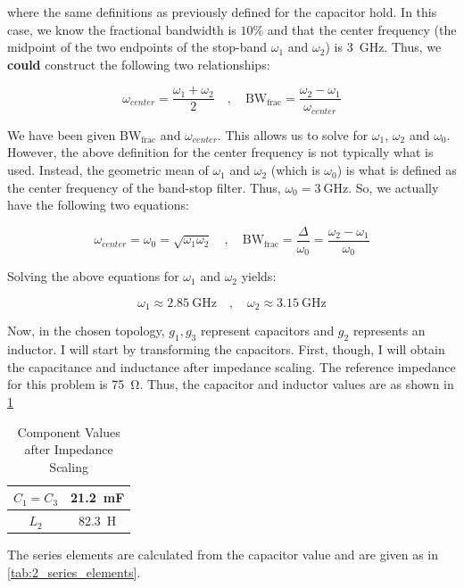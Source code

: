 where the same definitions as previously defined for the capacitor hold. In this
case, we know the fractional bandwidth is $10 \%$ and that the center frequency
(the midpoint of the two endpoints of the stop-band $\omega_1$ and $\omega_2$)
is \SI{3}{\giga\hertz}. Thus, we \textbf{could} construct the following two relationships:

\[
    \omega_{center} = \frac{\omega_1 + \omega_2}{2} \quad,\quad
    \text{BW}_{\text{frac}} = \frac{\omega_2 - \omega_1}{\omega_{center}}
\]

We have been given $\text{BW}_{\text{frac}}$ and $\omega_{center}$. This allows
us to solve for $\omega_1$, $\omega_2$ and $\omega_0$. However, the above
definition for the center frequency is not typically what is used. Instead, the
geometric mean of $\omega_1$ and $\omega_2$ (which is $\omega_0$) is what is
defined as the center frequency of the band-stop filter. Thus, $\omega_0 =
\SI{3}{\giga\hertz}$. So, we actually have the following two equations:

\[ 
    \omega_{center} = \omega_0 = \sqrt{\omega_1 \omega_2} \quad,\quad
    \text{BW}_{\text{frac}} = \frac{\Delta}{\omega_0} = \frac{\omega_2 -
    \omega_1}{\omega_0}
\]

Solving the above equations for $\omega_1$ and $ \omega_2 $ yields:

\[ 
    \omega_1 \approx \SI{2.85}{\giga\hertz} \quad,\quad \omega_2 \approx
    \SI{3.15}{\giga\hertz} 
\]

Now, in the chosen topology, $g_1, g_3$ represent capacitors and $g_2$
represents an inductor. I will start by transforming the capacitors. First,
though, I will obtain the capacitance and inductance after impedance scaling.
The reference impedance for this problem is \SI{75}{\ohm}. Thus, the capacitor
and inductor values are as shown in \ref{tab:2_comp_values}

\begin{table}[H]
    \centering
    \caption{Component Values after Impedance Scaling}
    \label{tab:2_comp_values}
    \begin{tabular}{|c|c|}
    \hline $ C_1 = C_3$ & \SI{21.2}{\milli\farad} \\
    \hline $ L_2 $ & \SI{82.3}{\henry} \\
    \hline
    \end{tabular}
\end{table}

The series elements are calculated from the capacitor value and are given as in
\ref{tab:2_series_elements}.

